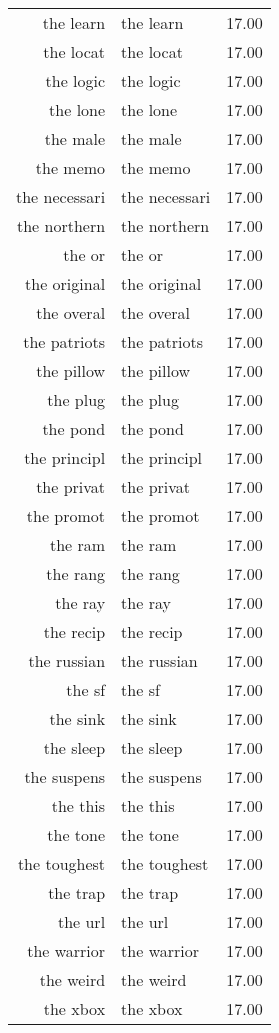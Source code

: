 \begin{table}[ht]
\begin{tabular}{rlr}
  the learn & the learn & 17.00 \\ 
  the locat & the locat & 17.00 \\ 
  the logic & the logic & 17.00 \\ 
  the lone & the lone & 17.00 \\ 
  the male & the male & 17.00 \\ 
  the memo & the memo & 17.00 \\ 
  the necessari & the necessari & 17.00 \\ 
  the northern & the northern & 17.00 \\ 
  the or & the or & 17.00 \\ 
  the original & the original & 17.00 \\ 
  the overal & the overal & 17.00 \\ 
  the patriots & the patriots & 17.00 \\ 
  the pillow & the pillow & 17.00 \\ 
  the plug & the plug & 17.00 \\ 
  the pond & the pond & 17.00 \\ 
  the principl & the principl & 17.00 \\ 
  the privat & the privat & 17.00 \\ 
  the promot & the promot & 17.00 \\ 
  the ram & the ram & 17.00 \\ 
  the rang & the rang & 17.00 \\ 
  the ray & the ray & 17.00 \\ 
  the recip & the recip & 17.00 \\ 
  the russian & the russian & 17.00 \\ 
  the sf & the sf & 17.00 \\ 
  the sink & the sink & 17.00 \\ 
  the sleep & the sleep & 17.00 \\ 
  the suspens & the suspens & 17.00 \\ 
  the this & the this & 17.00 \\ 
  the tone & the tone & 17.00 \\ 
  the toughest & the toughest & 17.00 \\ 
  the trap & the trap & 17.00 \\ 
  the url & the url & 17.00 \\ 
  the warrior & the warrior & 17.00 \\ 
  the weird & the weird & 17.00 \\ 
  the xbox & the xbox & 17.00 \\ 

\end{tabular}
\end{table}
